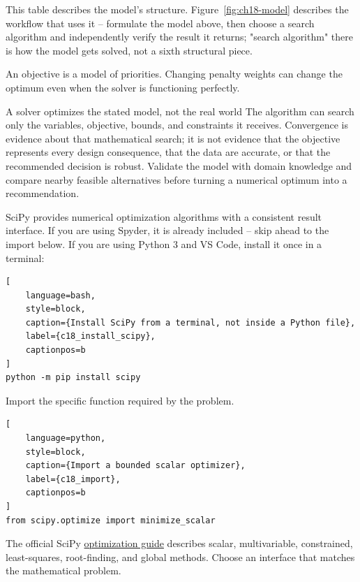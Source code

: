 This table describes the model's structure. Figure~\ref{fig:ch18-model}
describes the workflow that uses it -- formulate the model above, then choose
a search algorithm and independently verify the result it returns; "search
algorithm" there is how the model gets solved, not a sixth structural piece.

An objective is a model of priorities. Changing penalty weights can change the
optimum even when the solver is functioning perfectly.

\begin{ExplainBox}{A solver optimizes the stated model, not the real world}
The algorithm can search only the variables, objective, bounds, and constraints
it receives. Convergence is evidence about that mathematical search; it is not
evidence that the objective represents every design consequence, that the data
are accurate, or that the recommended decision is robust. Validate the model
with domain knowledge and compare nearby feasible alternatives before turning
a numerical optimum into a recommendation.
\end{ExplainBox}


SciPy provides numerical optimization algorithms with a consistent result
interface. If you are using Spyder, it is already included -- skip ahead to
the import below. If you are using Python 3 and VS Code, install it once in
a terminal:

\begin{lstlisting}[
    language=bash,
    style=block,
    caption={Install SciPy from a terminal, not inside a Python file},
    label={c18_install_scipy},
    captionpos=b
]
python -m pip install scipy
\end{lstlisting}

Import the specific function required by the problem.

\begin{lstlisting}[
    language=python,
    style=block,
    caption={Import a bounded scalar optimizer},
    label={c18_import},
    captionpos=b
]
from scipy.optimize import minimize_scalar
\end{lstlisting}

The official SciPy
\href{https://docs.scipy.org/doc/scipy/tutorial/optimize.html}{optimization guide}
describes scalar, multivariable, constrained, least-squares, root-finding, and
global methods. Choose an interface that matches the mathematical problem.


